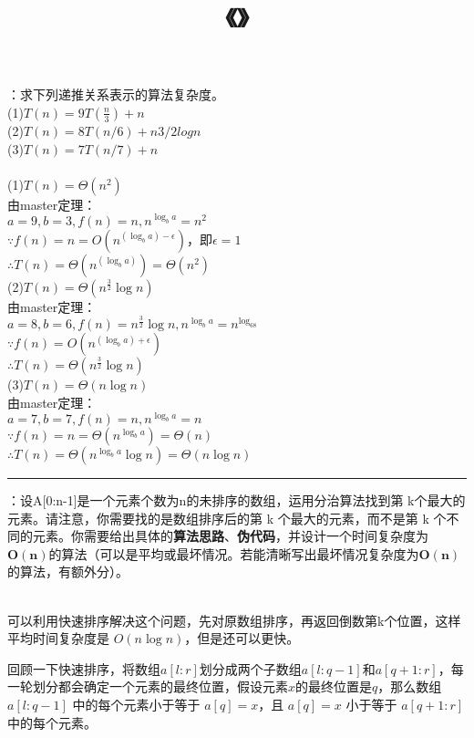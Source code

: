 \documentclass[UTF8,16pt]{article} %
\title{《\heiti{算法设计与分析}》\heiti{第{\color{red}2}次作业参考答案}}
\date{}
\begin{document}
	
\maketitle
\vbox{} %


：求下列递推关系表示的算法复杂度。\\
(1)$T(n)=9T(\frac{n}{3}) + n$\\
(2)$T(n)=8T(n/6)+n3/2logn$\\
(3)$T(n)=7T(n/7)+n$\\
{}\\
(1)$T(n)=\Theta(n^2)$\\
由master定理：\\
$a=9,b=3,f(n)=n, n^{\log _ba}=n^2$\\
$\because f(n)=n=O(n^{(\log _ba)-\epsilon})$，即$\epsilon=1$\\ 
$\therefore T(n)=\Theta(n^{(\log _ba)})=\Theta(n^2)$\\
(2)$T(n)= \Theta (n^{\frac{3}{2}}\log n)$ \\
由master定理：\\
$a=8,b=6,f(n)=n^{\frac{3}{2}}\log n, n^{\log _ba}=n^{\log _68}$\\
$\because f(n)=O(n^{(\log _ba)+\epsilon})$\\
$\therefore T(n)=\Theta(n^{\frac{3}{2}}\log n)$ \\
(3)$T(n)=\Theta  (n\log n)$\\
由master定理：\\
$a=7,b=7,f(n)=n, n^{\log _ba}=n$\\
$\because f(n)=n=\Theta(n^{\log _ba})=\Theta(n)$\\
$\therefore T(n)=\Theta(n^{\log _ba}\log n)=\Theta(n\log n)$\\
\rule[0pt]{14.3cm}{0.05em}

\vbox{} %
：设A[0:n-1]是一个元素个数为n的未排序的数组，运用分治算法找到第 k个最大的元素。请注意，你需要找的是数组排序后的第 k 个最大的元素，而不是第 k 个不同的元素。你需要给出具体的\textbf{算法思路}、\textbf{伪代码}，并设计一个时间复杂度为$\mathbf{O(n)}$的算法（可以是平均或最坏情况。若能清晰写出最坏情况复杂度为$\mathbf{O(n)}$的算法，有额外分）。\\
{}\\
{}

可以利用快速排序解决这个问题，先对原数组排序，再返回倒数第k个位置，这样平均时间复杂度是 $O(n \log n)$，但是还可以更快。

回顾一下快速排序，将数组$a[l:r]$划分成两个子数组$a[l:q - 1]$和$a[q + 1: r]$，每一轮划分都会确定一个元素的最终位置，假设元素$x$的最终位置是$q$，那么数组$a[l : q - 1]$ 中的每个元素小于等于 $a[q]=x$，且 $a[q]=x$ 小于等于 $a[q + 1 : r]$ 中的每个元素。
\end{document}
